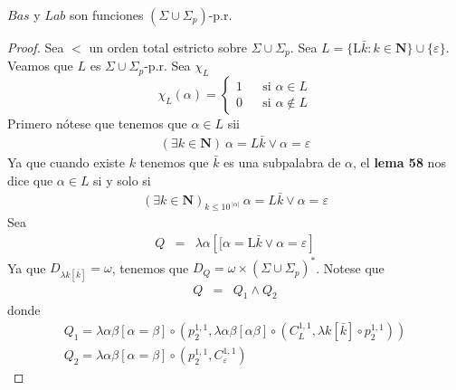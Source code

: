   \begin{lemma}
    $Bas$ y $Lab$ son funciones $(\Sigma \cup \Sigma _{p})$-p.r.

  \begin{proof}
    Sea $< $ un orden total estricto sobre $\Sigma \cup \Sigma _{p}$. Sea $L=\{ \mathrm{L}\bar{k}:k\in \mathbf{N}\}
    \cup \{\varepsilon \}$. Veamos que $ L $ es $\Sigma \cup \Sigma _{p}$-p.r.
    Sea $\chi_L$
    \[
      \displaystyle \chi_L(\alpha)=\left\{\begin{array}{lll}
                                            1 & & \text{si }\alpha\in L\\
                                            0 & & \text{si }\alpha\notin L
                                          \end{array}\right.
    \]
    Primero nótese que tenemos que $\alpha \in L$ sii
    \[
      \begin{array}{lll}
        (\exists k \in \mathbf{N})\ \alpha = L\bar{k} \lor \alpha = \varepsilon
      \end{array}
    \]
    Ya que cuando existe $k$ tenemos que $\bar{k}$ es una subpalabra de $\alpha $, el \textbf{lema 58} nos dice
    que $\alpha \in L$ si y solo si
    \[
      \begin{array}{lll}
        (\exists k \in \mathbf{N})_{k\leq 10^{\ \left\vert \alpha \right \vert}}\ \alpha = L\bar{k} \lor \alpha = \varepsilon
      \end{array}
    \]
    Sea
    \[
      \begin{array}{lll}
        Q & = & \lambda \alpha\left[
                                \lbrack \alpha = \mathrm{L}\bar{k} \lor \alpha = \varepsilon
                              \right]
      \end{array}
    \]
    Ya que $D_{\lambda k\left[ \bar{k}\right] }=\omega $, tenemos que
    $ D_{Q}=\omega \times (\Sigma \cup \Sigma _{p})^{\ast } $.
    Notese que
    \[
      \begin{array}{lll}
        Q & = & Q_1 \land Q_2
      \end{array}
    \]
    donde
    \[
      \begin{array}{lll}
        \displaystyle Q_1 = \lambda \alpha \beta \left[ \alpha =\beta \right] \circ
        \left( p_{2}^{1,1},
        \lambda \alpha \beta \left[ \alpha\beta \right] \circ (C_{L}^{1,1},\lambda k\left[ \bar{k}\right]
        \circ p_{2}^{1,1})
        \right) \\
        Q_2 = \lambda \alpha \beta \left[ \alpha =\beta \right] \circ (p_{2}^{1,1}, C_{\varepsilon}^{1,1})

\end{array}\]
\end{proof}
\end{lemma}
